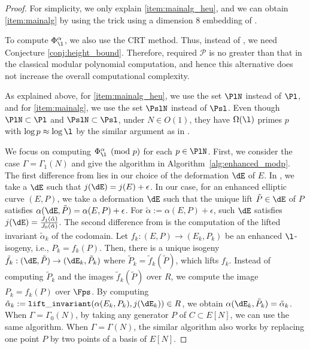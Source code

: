 \documentclass{amsart}
\theoremstyle{definition}
\theoremstyle{remark}
\numberwithin{equation}{section}
\begin{document}
\begin{proof}

For simplicity, we only explain \eqref{item:mainalg_heu}, and we can obtain \eqref{item:mainalg} by using the trick using a dimension 8 embedding of \cite[\S 3.5]{deformation_Kunzweiler_2024}.


To compute $\Phi_{\l}^{\alpha}$, 
we also use the CRT method.
Thus, instead of , we need Conjecture \ref{conj:height_bound}.
Therefore, required $\mathcal{P}$ is no greater than that in the classical modular polynomial computation, and hence this alternative does not increase the overall computational complexity. 

As explained above, 
for \eqref{item:mainalg_heu}, 
we use the set $\PlN$ instead of $\Pl$, and 
for \eqref{item:mainalg}, 
we use the set $\PslN$ instead of $\Psl$. 
Even though 
$\PlN\subset \Pl$ 
and $\PslN\subset \Psl$, 
under $N\in O(1)$, 
they have $\Omega(\l)$ primes $p$ with $\log p\approx\log\l$ by 
the similar argument as in \cite[\S 4.1]{deformation_Kunzweiler_2024}.


We focus on computing $\Phi_{\l}^{\alpha}\pmod p$ for each $p\in \PlN$. 
First, we consider the case $\Gamma=\Gamma_1(N)$ and 
give the algorithm in Algorithm~\ref{alg:enhanced_modp}. 
The first difference from  \cite{deformation_Kunzweiler_2024} lies in our choice of the deformation $\dE$ of $E$. 
In \cite{deformation_Kunzweiler_2024},
we take a $\dE$ such that $j(\dE)=j(E)+\epsilon$.
In our case, 
for an enhanced elliptic curve $(E,P)$, 
we take a deformation $\dE$ such that the unique lift $\tilde{P}\in \dE$ of $P$ satisfies 
$\alpha(\dE,\tilde{P})=\alpha(E,P)+\epsilon$.
For $\tilde{\alpha}:=\alpha(E,P)+\epsilon$, 
such $\dE$ satisfies 
$j(\dE)=\frac{J_1(\tilde{\alpha})}{J_0(\tilde{\alpha})}$. 
The second difference from  \cite{deformation_Kunzweiler_2024} is the computation of the lifted invariant  $\tilde{\alpha}_k$ of the codomain. 
Let $f_k:(E,P)\to (E_k,P_k)$ be an enhanced $\l$-isogeny, i.e., 
$P_k=f_k(P)$. 
Then, there is a unique isogeny 
$\tilde{f_k}:(\dE,\tilde{P})\to (\dE_k,\tilde{P}_k)$ 
where $\tilde{P}_k=\tilde{f}_k(\tilde{P})$,  which lifts $f_k$.  
Instead of computing $\tilde{P}_k$ and the images 
$\tilde{f}_k(\tilde{P})$ over $R$,  
we compute the image $P_k=f_k(P)$ over $\Fps$. 
By computing $\tilde{\alpha}_k:=\mathtt{lift\_invariant}(\alpha(E_k,P_k),j(\dE_k))\in R$, 
we obtain 
$\alpha(\dE_k,\tilde{P}_k)=\tilde{\alpha}_k$.  
When $\Gamma=\Gamma_0(N)$, 
by taking any generator $P$ of $C\subset E[N]$,
we can use the same algorithm.
When $\Gamma=\Gamma(N)$, 
the similar algorithm also works by replacing one point $P$ by two points of a basis of $E[N]$. 




\end{proof}
\end{document}

